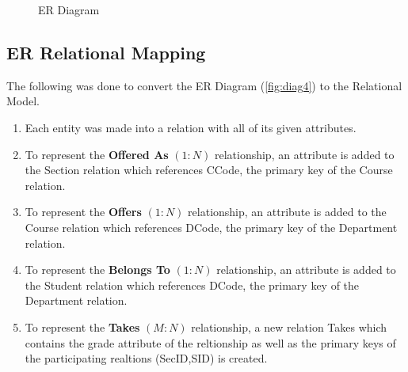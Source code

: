\documentclass[a4paper,11pt]{article}
\begin{document}
\begin{figure}[H]
\caption{ER Diagram}
\label{fig:diag4}
\end{figure}
\subsection{ER Relational Mapping}
The following was done to convert the ER Diagram (\autoref{fig:diag4}) to the Relational Model.
\begin{enumerate}
\item Each entity was made into a relation with all of its given attributes.
\item To represent the \textbf{Offered As} $(1:N)$ relationship, an attribute is added to the Section relation which references CCode, the primary key of the Course relation.
\item To represent the \textbf{Offers} $(1:N)$ relationship, an attribute is added to the Course relation which references DCode, the primary key of the Department relation.
\item To represent the \textbf{Belongs To} $(1:N)$ relationship, an attribute is added to the Student relation which references DCode, the primary key of the Department relation.
\item To represent the \textbf{Takes} $(M:N)$ relationship, a new relation Takes which contains the grade attribute of the reltionship as well as the primary keys of the participating realtions (SecID,SID) is created.
\end{enumerate}
\end{document}
